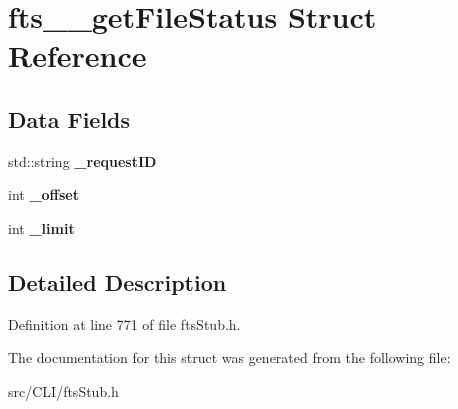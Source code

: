 \section{fts\_\-\_\-getFileStatus Struct Reference}
\label{structfts____getFileStatus}
\subsection*{Data Fields}
\begin{DoxyCompactItemize}
\item 
std::string {\bfseries \_\-requestID}\label{structfts____getFileStatus_a7c03a6e67ce64d1bccd4c66def041918}

\item 
int {\bfseries \_\-offset}\label{structfts____getFileStatus_aa341cdce02c6c5dbaffa2da567eab1dd}

\item 
int {\bfseries \_\-limit}\label{structfts____getFileStatus_a6fc6c63c1aef69c50a5f5b53b1c3ffc6}

\end{DoxyCompactItemize}


\subsection{Detailed Description}


Definition at line 771 of file ftsStub.h.



The documentation for this struct was generated from the following file:\begin{DoxyCompactItemize}
\item 
src/CLI/ftsStub.h\end{DoxyCompactItemize}
